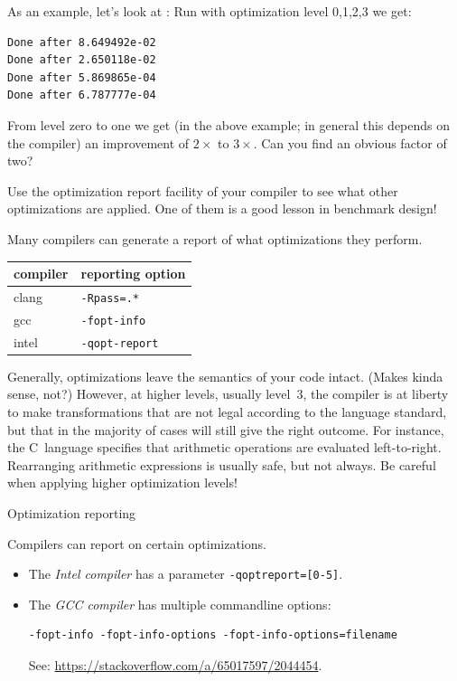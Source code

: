 As an example, let's look at :
Run with optimization level 0,1,2,3 we get:
\begin{lstlisting}
Done after 8.649492e-02
Done after 2.650118e-02
Done after 5.869865e-04
Done after 6.787777e-04
\end{lstlisting}
\begin{exercise}
  \label{ex:givens-optimize}
  From level zero to one we get (in the above example;
  in general this depends on the compiler) an improvement
  of $2\times$ to $3\times$. Can you find an obvious factor of two?

  Use the optimization report facility of your compiler to see what
  other optimizations are applied. One of them is a good lesson in
  benchmark design!
\end{exercise}

Many compilers can generate a report of what optimizations they perform.

\begin{tabular}{ll}
  \toprule
  compiler&reporting option\\
  \midrule
  clang& \texttt{-Rpass=.*}\\
  gcc&   \texttt{-fopt-info}\\
  intel& \texttt{-qopt-report}\\
  \bottomrule
\end{tabular}

Generally, optimizations leave the semantics of your code
intact. (Makes kinda sense, not?)  However, at higher levels,
usually level~3, the compiler is
at liberty to make transformations that are not legal
according to the language standard, but that in the majority of cases
will still give the right outcome. For instance, the C~language
specifies that arithmetic operations are evaluated left-to-right.
Rearranging arithmetic expressions is usually safe, but not always.
Be careful when applying higher optimization levels!

 {Optimization reporting}

Compilers can report on certain optimizations.
\begin{itemize}
\item The \emph{Intel compiler}
  has a parameter \lstinline{-qoptreport=[0-5]}.
\item The \emph{GCC compiler}
  has multiple commandline options:
\begin{lstlisting}
-fopt-info -fopt-info-options -fopt-info-options=filename
\end{lstlisting}
See: \url{https://stackoverflow.com/a/65017597/2044454}.
\end{itemize}

